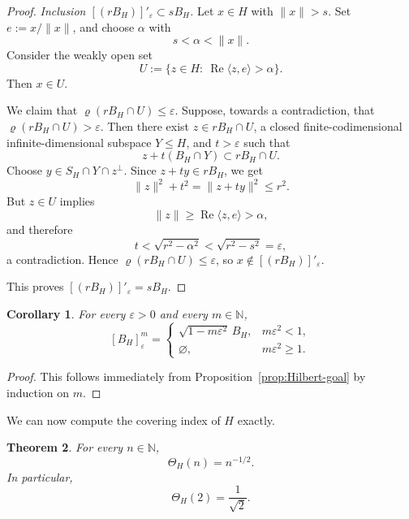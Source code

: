 \documentclass[reqno,11pt]{amsart}
\theoremstyle{plain}
\newtheorem{theorem}{Theorem}[section]
\newtheorem{corollary}[theorem]{Corollary}
\theoremstyle{definition}
\theoremstyle{remark}
\newcommand{\N}{\mathbb{N}}
\renewcommand{\le}{\leqslant}
\renewcommand{\ge}{\geqslant}
\begin{document}
\begin{proof}
\smallskip
\noindent\emph{Inclusion $[(rB_H)]'_{\varepsilon}\subset sB_H$.}
Let $x\in H$ with $\|x\|>s$.  Set $e:=x/\|x\|$, and choose $\alpha$ with
\[
s<\alpha<\|x\|.
\]
Consider the weakly open set
\[
U:=\bigl\{z\in H:\ \operatorname{Re}\langle z,e\rangle>\alpha\bigr\}.
\]
Then $x\in U$.

We claim that $\varrho(rB_H\cap U)\le\varepsilon$.  Suppose, towards a contradiction,
that $\varrho(rB_H\cap U)>\varepsilon$.  Then there exist
$z\in rB_H\cap U$, a closed finite-codimensional infinite-dimensional subspace
$Y\le H$, and $t>\varepsilon$ such that
\[
z+t(B_H\cap Y)\subset rB_H\cap U.
\]
Choose $y\in S_H\cap Y\cap z^\perp$.  Since $z+ty\in rB_H$, we get
\[
\|z\|^2+t^2=\|z+ty\|^2\le r^2.
\]
But $z\in U$ implies
\[
\|z\|\ge \operatorname{Re}\langle z,e\rangle>\alpha,
\]
and therefore
\[
t<\sqrt{r^2-\alpha^2}<\sqrt{r^2-s^2}=\varepsilon,
\]
a contradiction.  Hence $\varrho(rB_H\cap U)\le\varepsilon$, so
$x\notin[(rB_H)]'_{\varepsilon}$.

This proves $[(rB_H)]'_{\varepsilon}=sB_H$.
\end{proof}

\begin{corollary}\label{cor:Hilbert-goal-iterates}
For every $\varepsilon>0$ and every $m\in\N$,
\[
[B_H]^m_{\varepsilon}
=
\begin{cases}
\sqrt{1-m\varepsilon^2}\,B_H,& m\varepsilon^2<1,\\[1mm]
\varnothing,& m\varepsilon^2\ge1.
\end{cases}
\]
\end{corollary}

\begin{proof}
This follows immediately from Proposition~\ref{prop:Hilbert-goal} by induction on $m$.
\end{proof}

We can now compute the covering index of $H$ exactly.

\begin{theorem}\label{thm:Hilbert-n}
For every $n\in\N$,
\[
\Theta_H(n)=n^{-1/2}.
\]
In particular,
\[
\Theta_H(2)=\frac1{\sqrt2}.
\]
\end{theorem}
\end{document}
